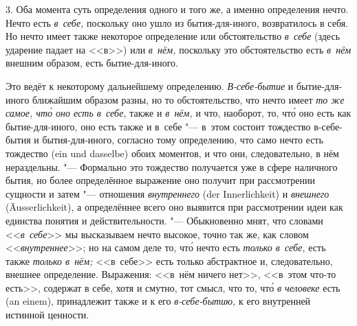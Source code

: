 3. Оба момента суть определения одного и того же, а именно определения
нечто. Нечто есть {\em в~себе,} поскольку оно ушло из
бытия-для-иного, возвратилось в себя. Но нечто имеет также некоторое
определение или обстоятельство {\em в~себе} (здесь
ударение падает на <<в>>) или {\em в~нём,} поскольку это
обстоятельство есть {\em в~нём} внешним образом, есть
бытие-для-иного.

Это ведёт к некоторому дальнейшему определению.
{\em В-себе-бытие} и бытие-для-иного ближайшим
образом разны, но то обстоятельство, что нечто имеет
{\em то же самое, чт\'{о} оно есть в~себе,} также и {\em в~нём,} и что,
наоборот, то,
чт\'{о} оно есть как бытие-для-иного, оно есть также и в~себе "--- в~этом
состоит тождество в-себе-бытия и бытия-для-иного, согласно тому
определению, что само нечто есть тождество (ein und dasselbe) обоих
моментов, и что они, следовательно, в нём нераздельны. "--- Формально это
тождество получается уже в сфере наличного бытия, но более определённое
выражение оно получит при рассмотрении сущности и затем "--- отношения
{\em внутреннего} (der Inner\-lich\-keit) и
{\em внешнего} (Äusser\-lich\-keit), а определённее всего
оно выявится при рассмотрении идеи как единства понятия и действительности.
"--- Обыкновенно мнят, что словами <<{\em в~себе}>> мы
высказываем нечто высокое, точно так же, как словом
<<{\em внутреннее}>>; но на самом деле то, чт\'{о} нечто есть
{\em только в~себе,} есть также {\em только в~нём;} <<в~себе>> есть только
абстрактное и, следовательно, внешнее определение. Выражения: <<в~нём
ничего нет>>, <<в~этом что-то есть>>, содержат в себе, хотя и смутно, тот
смысл, что то, чт\'{о} {\em в человеке} есть (an einem), принадлежит также
и к его {\em в-себе-бытию,} к его внутренней истинной ценности.

